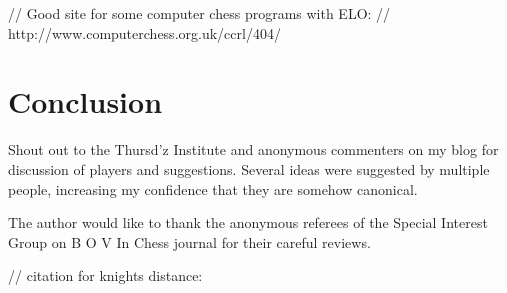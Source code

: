 \documentclass[10pt,preprint,twocolumn]{acmart}
\begin{document}
// Good site for some computer chess programs with ELO:
// http://www.computerchess.org.uk/ccrl/404/

\section{Conclusion}

Shout out to the Thursd'z Institute and anonymous commenters
on my blog for discussion of players and suggestions. Several
ideas were suggested by multiple people, increasing my confidence
that they are somehow canonical.

The author would like to thank the anonymous referees
of the Special Interest Group on
B
O
V
In
Chess journal for their careful reviews.

\nocite{elo1978rating}
\nocite{topple}
// citation for knights distance:
\nocite{miller2013counting}
\nocite{watkins2017losing}

% 


\end{document}
